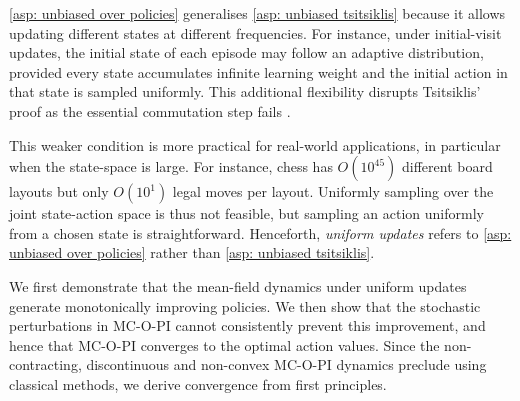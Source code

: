 \autoref{asp: unbiased over policies} generalises \autoref{asp: unbiased tsitsiklis} because it allows updating different states at different frequencies.
For instance, under initial-visit updates, the initial state of each episode may follow an adaptive distribution, provided every state accumulates infinite learning weight and the initial action in that state is sampled uniformly.
This additional flexibility disrupts Tsitsiklis' proof as the essential commutation step fails \citep[p.~64]{Tsitsiklis2002OnIteration}.


This weaker condition is more practical for real-world applications, in particular when the state-space is large.
For instance, chess has $O(10^{45})$ different board layouts but only $O (10^1)$ legal moves per layout.
Uniformly sampling over the joint state-action space is thus not feasible, but sampling an action uniformly from a chosen state is straightforward.
Henceforth, \textit{uniform updates} refers to \autoref{asp: unbiased over policies} rather than \autoref{asp: unbiased tsitsiklis}.


We first demonstrate that the mean-field dynamics under uniform updates generate monotonically improving policies.
We then show that the stochastic perturbations in MC-O-PI cannot consistently prevent this improvement, and hence that MC-O-PI converges to the optimal action values.
Since the non-contracting, discontinuous and non-convex MC-O-PI dynamics preclude using classical methods, we derive convergence from first principles.






